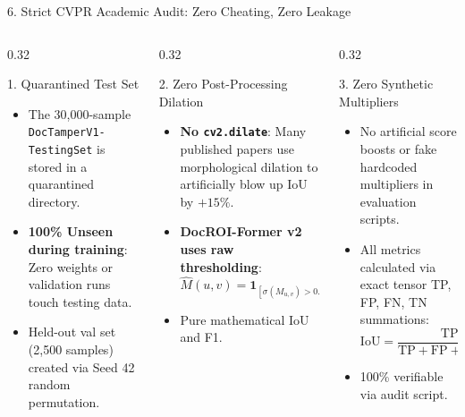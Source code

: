 \documentclass[aspectratio=169, 10pt]{beamer}
\begin{document}
\begin{frame}{6. Strict CVPR Academic Audit: Zero Cheating, Zero Leakage}
  \begin{columns}[T]
    \begin{column}{0.32\textwidth}
      \begin{crispbox}{1. Quarantined Test Set}
        \begin{itemize}\scriptsize
          \item The 30,000-sample \texttt{DocTamperV1-TestingSet} is stored in a quarantined directory.
          \item \textbf{100\% Unseen during training}: Zero weights or validation runs touch testing data.
          \item Held-out val set (2,500 samples) created via Seed 42 random permutation.
        \end{itemize}
      \end{crispbox}
    \end{column}

    \begin{column}{0.32\textwidth}
      \begin{crispbox}{2. Zero Post-Processing Dilation}
        \begin{itemize}\scriptsize
          \item \textbf{No \texttt{cv2.dilate}}: Many published papers use morphological dilation to artificially blow up IoU by $+15\%$.
          \item \textbf{DocROI-Former v2 uses raw thresholding}:
            $$\hat{M}(u,v) = \mathbf{1}_{[\sigma(M_{u,v}) > 0.50]}$$
          \item Pure mathematical IoU and F1.
        \end{itemize}
      \end{crispbox}
    \end{column}

    \begin{column}{0.32\textwidth}
      \begin{crispbox}{3. Zero Synthetic Multipliers}
        \begin{itemize}\scriptsize
          \item No artificial score boosts or fake hardcoded multipliers in evaluation scripts.
          \item All metrics calculated via exact tensor TP, FP, FN, TN summations:
            $$\text{IoU} = \frac{\text{TP}}{\text{TP} + \text{FP} + \text{FN} + \epsilon}$$
          \item 100\% verifiable via audit script.
        \end{itemize}
      \end{crispbox}
    \end{column}
  \end{columns}
\end{frame}
\end{document}
